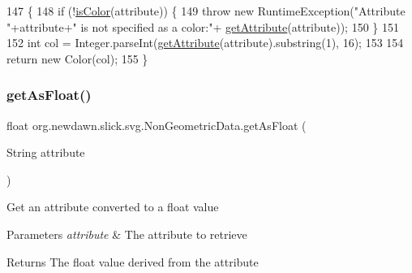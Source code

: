 \begin{DoxyCode}
147                                               \{
148         \textcolor{keywordflow}{if} (!\mbox{\hyperlink{classorg_1_1newdawn_1_1slick_1_1svg_1_1_non_geometric_data_a3712fb62547b297f7d08259682fc2d90}{isColor}}(attribute)) \{
149             \textcolor{keywordflow}{throw} \textcolor{keyword}{new} RuntimeException(\textcolor{stringliteral}{"Attribute "}+attribute+\textcolor{stringliteral}{" is not specified as a color:"}+
      \mbox{\hyperlink{classorg_1_1newdawn_1_1slick_1_1svg_1_1_non_geometric_data_af14f4628737e3da9379ac25e0a56a92d}{getAttribute}}(attribute));
150         \}
151         
152         \textcolor{keywordtype}{int} col = Integer.parseInt(\mbox{\hyperlink{classorg_1_1newdawn_1_1slick_1_1svg_1_1_non_geometric_data_af14f4628737e3da9379ac25e0a56a92d}{getAttribute}}(attribute).substring(1), 16);
153         
154         \textcolor{keywordflow}{return} \textcolor{keyword}{new} Color(col);
155     \}
\end{DoxyCode}
\mbox{\label{classorg_1_1newdawn_1_1slick_1_1svg_1_1_non_geometric_data_a67a551dc7a2ce368d247d0db71dadf05}} 
\subsubsection{\texorpdfstring{get\+As\+Float()}{getAsFloat()}}
{\footnotesize\ttfamily float org.\+newdawn.\+slick.\+svg.\+Non\+Geometric\+Data.\+get\+As\+Float (\begin{DoxyParamCaption}\item[{String}]{attribute }\end{DoxyParamCaption})\hspace{0.3cm}{\ttfamily [inline]}}

Get an attribute converted to a float value


\begin{DoxyParams}{Parameters}
{\em attribute} & The attribute to retrieve \\
\hline
\end{DoxyParams}
\begin{DoxyReturn}{Returns}
The float value derived from the attribute 
\end{DoxyReturn}

